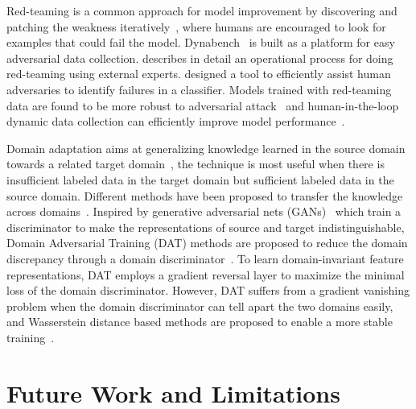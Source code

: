 \documentclass[letterpaper]{article} %
\begin{document}
Red-teaming is a common approach for model improvement by discovering and patching the weakness iteratively~\cite{dinan2019adv, vidgen2020worst, kiela2021dynabench, ziegler2022adv,perez2022red,ribeiro-etal-2020-beyond}, where humans are encouraged to look for examples that could fail the model. Dynabench~\cite{kiela2021dynabench} is built as a platform for easy adversarial data collection. \citet{mishkin2022risks} describes in detail an operational process for doing red-teaming using external experts. \citet{ziegler2022adv} designed a tool to efficiently assist human adversaries to identify failures in a classifier. Models trained with red-teaming data are found to be more robust to adversarial attack~\cite{dinan2019adv,ziegler2022adv} and human-in-the-loop dynamic data collection can efficiently improve model performance~\cite{kiela2021dynabench,vidgen2020worst}.


Domain adaptation aims at generalizing knowledge learned in the source domain towards a related target domain~\citep{BenDavid2006AnalysisOR, Weiss2016ASO, BenDavid2009ATO}, the technique is most useful when there is insufficient labeled data in the target domain but sufficient labeled data in the source domain. Different methods have been proposed to transfer the knowledge across domains~\citep{Ramponi2020NeuralUD, Blitzer2006DomainAW, Mansour2008DomainAW}.
Inspired by generative adversarial nets (GANs)~\citep{Goodfellow2014GenerativeAN} which train a discriminator to make the representations of source and target indistinguishable, Domain Adversarial Training (DAT) methods are proposed to reduce the domain discrepancy through a domain discriminator~\citep{pmlr-v70-arjovsky17a, Ganin2016DomainAdversarialTO, Tzeng2017AdversarialDD, Ganin2015UnsupervisedDA}. To learn domain-invariant feature representations, DAT employs a gradient reversal layer to maximize the minimal loss of the domain discriminator. However, DAT suffers from a gradient vanishing problem when the domain discriminator can tell apart the two domains easily, and Wasserstein distance based methods are proposed to enable a more stable training~\citep{Shen2018WassersteinDG, pmlr-v70-arjovsky17a, shah-etal-2018-adversarial}.


\section{Future Work and Limitations}
\label{sec:future}
\end{document}
